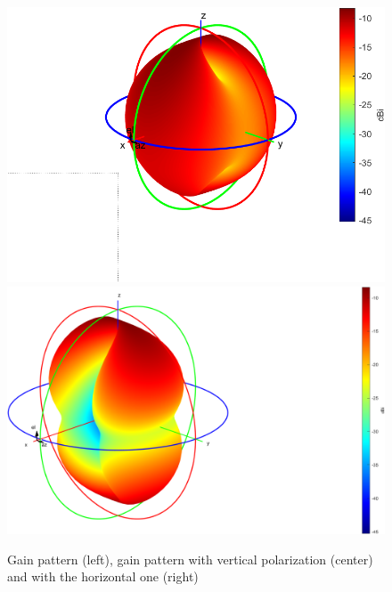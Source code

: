 \documentclass[12pt,a4paper]{article}
\begin{document}
{\begin{center}
\begin{figure}
\includegraphics[width = 0.3\linewidth]{gain_patch_v.png}
\includegraphics[width = 0.3\linewidth]{gain_patch_h.png}
\caption{Gain pattern (left), gain pattern with vertical polarization (center) and with the horizontal one (right)}
\end{figure}
\end{center}
}
\end{document}
